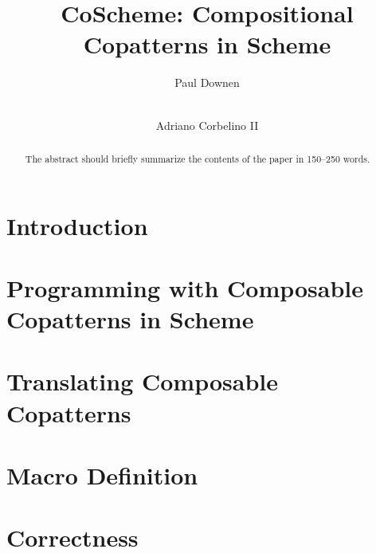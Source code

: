 \documentclass[runningheads]{llncs}
\begin{document}
%
\title{CoScheme: Compositional Copatterns in Scheme}
%
%
\author{
  Paul Downen
  \and \\
  Adriano Corbelino II
}
%
%
%
\maketitle              %
%
\begin{abstract}
The abstract should briefly summarize the contents of the paper in
150--250 words.

\end{abstract}
%
%
%
\section{Introduction} \label{sec-intro}



\section{Programming with Composable Copatterns in Scheme}
\label{sec-examples}



\section{Translating Composable Copatterns} \label{sec-translation}



\section{Macro Definition} \label{sec-macro}



\section{Correctness} \label{sec-correctness}
\end{document}
